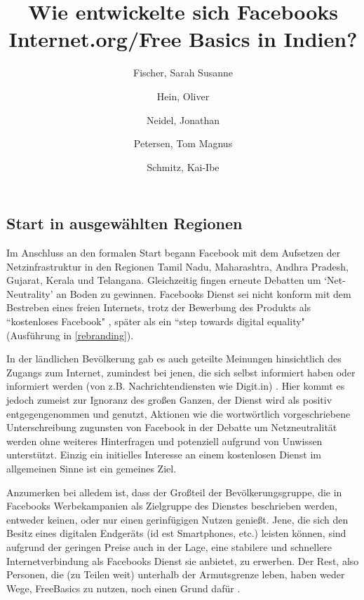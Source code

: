 \documentclass{article}
\title{Wie entwickelte sich Facebooks Internet.org/Free Basics in Indien?}
\author{
  Fischer, Sarah Susanne\\
  \and
  Hein, Oliver\\
  \and
  Neidel, Jonathan\\
  \and
  Petersen, Tom Magnus\\
  \and
  Schmitz, Kai-Ibe\\
}
\begin{document}
\maketitle
\subsection{Start in ausgewählten Regionen}

Im Anschluss an den formalen Start begann Facebook mit dem Aufsetzen der Netzinfrastruktur in den Regionen Tamil Nadu, Maharashtra, Andhra Pradesh, Gujarat, Kerala und Telangana.
Gleichzeitig fingen erneute Debatten um `Net-Neutrality' an Boden zu gewinnen.
Facebooks Dienst sei nicht konform mit dem Bestreben eines freien Internets, trotz der Bewerbung des Produkts als ``kostenloses Facebook" \parencite[3]{prasad2017}, später als ein ``step towards digital equality" (Ausführung in \ref{rebranding}).

\medskip

In der ländlichen Bevölkerung gab es auch geteilte Meinungen hinsichtlich des Zugangs zum Internet, zumindest bei jenen, die sich selbst informiert haben oder informiert werden (von z.B. Nachrichtendiensten wie Digit.in) \parencite{digitYT}.
Hier kommt es jedoch zumeist zur Ignoranz des großen Ganzen, der Dienst wird als positiv entgegengenommen und genutzt, Aktionen wie die wortwörtlich vorgeschriebene Unterschreibung zugunsten von Facebook in der Debatte um Netzneutralität\autocite{ndtvYT} werden ohne weiteres Hinterfragen und potenziell aufgrund von Unwissen unterstützt.
Einzig ein initielles Interesse an einem kostenlosen Dienst im allgemeinen Sinne ist ein gemeines Ziel.

\medskip

Anzumerken bei alledem ist, dass der Großteil der Bevölkerungsgruppe, die in Facebooks Werbekampanien als Zielgruppe des Dienstes beschrieben werden, entweder keinen, oder nur einen gerinfügigen Nutzen genießt.
Jene, die sich den Besitz eines digitalen Endgeräts (id est Smartphones, etc.) leisten können, sind aufgrund der geringen Preise auch in der Lage, eine stabilere und schnellere Internetverbindung als Facebooks Dienst sie anbietet, zu erwerben.
Der Rest, also Personen, die (zu Teilen weit) unterhalb der Armutsgrenze leben, haben weder Wege, FreeBasics zu nutzen, noch einen Grund dafür \parencite[257]{everydayLife}.

\medskip
\end{document}
